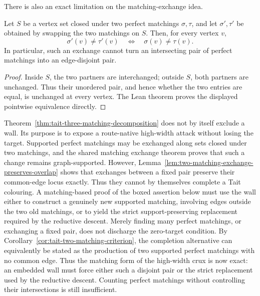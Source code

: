 There is also an exact limitation on the matching-exchange idea.

\begin{lemma}
\label{lem:two-matching-exchange-preserves-overlap}
Let \(S\) be a vertex set closed under two perfect matchings
\(\sigma,\tau\), and let \(\sigma',\tau'\) be obtained by swapping the two
matchings on \(S\).  Then, for every vertex \(v\),
\[
  \sigma'(v)\ne\tau'(v)\quad\Longleftrightarrow\quad
  \sigma(v)\ne\tau(v).
\]
In particular, such an exchange cannot turn an intersecting pair of perfect
matchings into an edge-disjoint pair.
\end{lemma}

\begin{proof}
Inside \(S\), the two partners are interchanged; outside \(S\), both partners
are unchanged.  Thus their unordered pair, and hence whether the two entries
are equal, is unchanged at every vertex.  The Lean theorem proves the displayed
pointwise equivalence directly.
\end{proof}

Theorem~\ref{thm:tait-three-matching-decomposition} does not by itself
exclude a wall.  Its purpose is to expose a route-native high-width attack
without losing the target.  Supported perfect matchings may be exchanged along
sets closed under two matchings, and the shared matching exchange theorem
proves that such a change remains graph-supported.  However,
Lemma~\ref{lem:two-matching-exchange-preserves-overlap} shows that exchanges
between a fixed pair preserve their common-edge locus exactly.  Thus they
cannot by themselves complete a Tait colouring.  A matching-based proof of the
boxed assertion below must use the wall either to construct a genuinely new
supported matching, involving edges outside the two old matchings, or to yield
the strict support-preserving replacement required by the reductive descent.
Merely finding many perfect matchings, or exchanging a fixed pair, does not
discharge the zero-target condition.
By Corollary~\ref{cor:tait-two-matching-criterion}, the completion alternative
can equivalently be stated as the production of two supported perfect
matchings with no common edge.  Thus the matching form of the high-width crux
is now exact: an embedded wall must force either such a disjoint pair or the
strict replacement used by the reductive descent.  Counting perfect matchings
without controlling their intersections is still insufficient.

